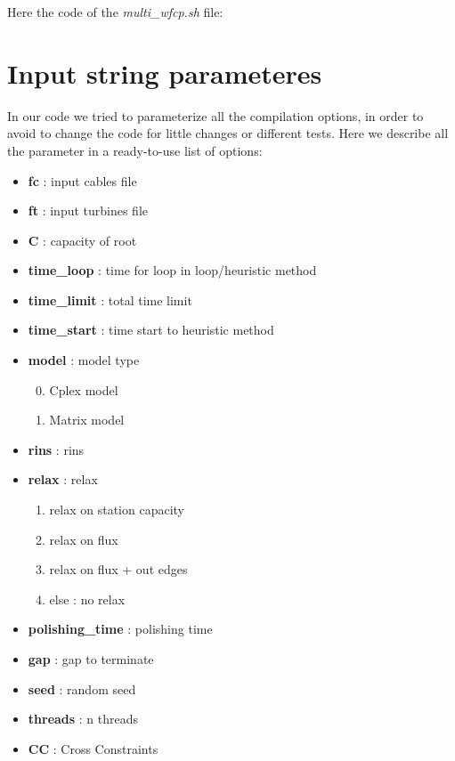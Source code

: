 \begin{appendices}
Here the code of the \textit{multi\_wfcp.sh} file:
\newpage


\chapter{Input string parameteres}
In our code we tried to parameterize all the compilation options, in order to avoid to change the code for little changes or different tests. Here we describe all the parameter in a ready-to-use list of options: 
\begin{itemize}
\setlength{\parskip}{0pt}
\setlength{\itemsep}{0.5pt plus 1pt}
\item \textbf{fc} : input cables file
\item \textbf{ft} : input turbines file
\item \textbf{C} : capacity of root
\item \textbf{time\_loop} : time for loop in loop/heuristic method
\item \textbf{time\_limit} : total time limit
\item \textbf{time\_start} : time start to heuristic method
\item \textbf{model} : model type
\begin{enumerate}\setcounter{enumi}{-1}
\setlength{\parskip}{0pt}
\setlength{\itemsep}{0pt plus 1pt}
	\item Cplex model
	\item Matrix model
\end{enumerate}
\item \textbf{rins} : rins
\item \textbf{relax} : relax
\begin{enumerate}\setcounter{enumi}{0}
\setlength{\parskip}{0pt}
\setlength{\itemsep}{0pt plus 1pt}
	\item relax on station capacity
	\item relax on flux
	\item relax on flux + out edges
	\item[] else : no relax
\end{enumerate}
\item \textbf{polishing\_time} : polishing time
\item \textbf{gap} : gap to terminate
\item \textbf{seed} : random seed
\item \textbf{threads} : n threads
\item \textbf{CC} : Cross Constraints

\end{itemize}
\end{appendices}
